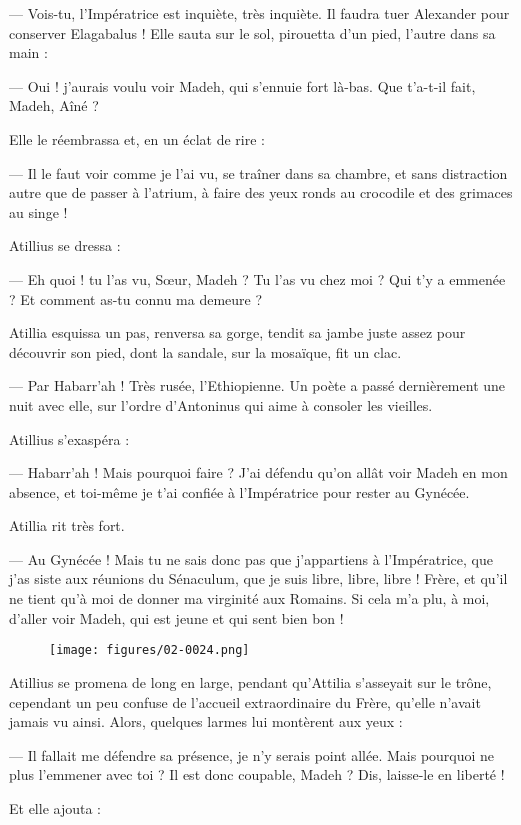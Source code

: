 \documentclass[a4paper, 11pt, oneside, polutonikogreek, french]{article}
\begin{document}
--- Vois-tu, l'Impératrice est inquiète, très inquiète. Il faudra tuer Alexander pour conserver Elagabalus !
Elle sauta sur le sol, pirouetta d'un pied, l'autre dans sa main :

--- Oui ! j'aurais voulu voir Madeh, qui s'ennuie fort là-bas. Que t'a-t-il fait, Madeh, Aîné ?

Elle le réembrassa et, en un éclat de rire :

--- Il le faut voir comme je l'ai vu, se traîner dans sa chambre, et sans distraction autre que de passer à l'atrium, à faire des yeux ronds au crocodile et des grimaces au singe !

Atillius se dressa :

--- Eh quoi ! tu l'as vu, Sœur, Madeh ? Tu l'as vu chez moi ? Qui t'y a emmenée ? Et comment as-tu connu ma demeure ?

Atillia esquissa un pas, renversa sa gorge, tendit sa jambe juste assez pour découvrir son pied, dont la sandale, sur la mosaïque, fit un clac.

--- Par Habarr’ah ! Très rusée, l'Ethiopienne. Un poète a passé dernièrement une nuit avec elle, sur l'ordre d'Antoninus qui aime à consoler les vieilles.

Atillius s'exaspéra :

--- Habarr'ah ! Mais pourquoi faire ? J'ai défendu qu'on allât voir Madeh en mon absence, et toi-même je t'ai confiée à l'Impératrice pour rester au Gynécée.

Atillia rit très fort.

--- Au Gynécée ! Mais tu ne sais donc pas que j'appartiens à l'Impératrice, que j'as siste aux réunions du Sénaculum, que je suis libre, libre, libre ! Frère, et qu'il ne tient qu'à moi de donner ma virginité aux Romains. Si cela m'a plu, à moi, d'aller voir Madeh, qui est jeune et qui sent bien bon !
\begin{figure}[H]
\centering
\texttt{[image: figures/02-0024.png]}
\end{figure}
Atillius se promena de long en large, pendant qu'Attilia s'asseyait sur le trône, cependant un peu confuse de l'accueil extraordinaire du Frère, qu'elle n'avait jamais vu ainsi. Alors, quelques larmes lui montèrent aux yeux :

--- Il fallait me défendre sa présence, je n'y serais point allée. Mais pourquoi ne plus l'emmener avec toi ? Il est donc coupable, Madeh ? Dis, laisse-le en liberté !

Et elle ajouta :
\end{document}
